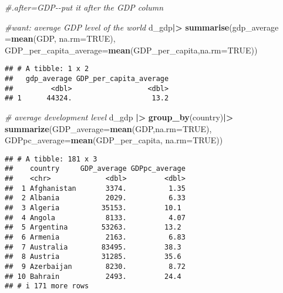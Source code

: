 \documentclass[
]{article}
\newenvironment{Shaded}{\begin{snugshade}}{\end{snugshade}}
\newcommand{\AttributeTok}[1]{\textcolor[rgb]{0.13,0.29,0.53}{#1}}
\newcommand{\CommentTok}[1]{\textcolor[rgb]{0.56,0.35,0.01}{\textit{#1}}}
\newcommand{\ConstantTok}[1]{\textcolor[rgb]{0.56,0.35,0.01}{#1}}
\newcommand{\FunctionTok}[1]{\textcolor[rgb]{0.13,0.29,0.53}{\textbf{#1}}}
\newcommand{\NormalTok}[1]{#1}
\newcommand{\SpecialCharTok}[1]{\textcolor[rgb]{0.81,0.36,0.00}{\textbf{#1}}}
\begin{document}
\begin{Shaded}
\begin{Highlighting}[]
\CommentTok{\#.after=GDP{-}{-}put it after the GDP column}
\end{Highlighting}
\end{Shaded}

\begin{Shaded}
\begin{Highlighting}[]
\CommentTok{\#want: average GDP level of the world}
\NormalTok{d\_gdp}\SpecialCharTok{|\textgreater{}}
  \FunctionTok{summarise}\NormalTok{(}\AttributeTok{gdp\_average =}\FunctionTok{mean}\NormalTok{(GDP, }\AttributeTok{na.rm=}\ConstantTok{TRUE}\NormalTok{),}
            \AttributeTok{GDP\_per\_capita\_average=}\FunctionTok{mean}\NormalTok{(GDP\_per\_capita,}\AttributeTok{na.rm=}\ConstantTok{TRUE}\NormalTok{))}
\end{Highlighting}
\end{Shaded}

\begin{verbatim}
## # A tibble: 1 x 2
##   gdp_average GDP_per_capita_average
##         <dbl>                  <dbl>
## 1      44324.                   13.2
\end{verbatim}

\begin{Shaded}
\begin{Highlighting}[]
\CommentTok{\# average development level}
\NormalTok{d\_gdp }\SpecialCharTok{|\textgreater{}}
  \FunctionTok{group\_by}\NormalTok{(country)}\SpecialCharTok{|\textgreater{}}
  \FunctionTok{summarize}\NormalTok{(}\AttributeTok{GDP\_average=}\FunctionTok{mean}\NormalTok{(GDP,}\AttributeTok{na.rm=}\ConstantTok{TRUE}\NormalTok{),}
            \AttributeTok{GDPpc\_average=}\FunctionTok{mean}\NormalTok{(GDP\_per\_capita, }\AttributeTok{na.rm=}\ConstantTok{TRUE}\NormalTok{))}
\end{Highlighting}
\end{Shaded}

\begin{verbatim}
## # A tibble: 181 x 3
##    country     GDP_average GDPpc_average
##    <chr>             <dbl>         <dbl>
##  1 Afghanistan       3374.          1.35
##  2 Albania           2029.          6.33
##  3 Algeria          35153.         10.1 
##  4 Angola            8133.          4.07
##  5 Argentina        53263.         13.2 
##  6 Armenia           2163.          6.83
##  7 Australia        83495.         38.3 
##  8 Austria          31285.         35.6 
##  9 Azerbaijan        8230.          8.72
## 10 Bahrain           2493.         24.4 
## # i 171 more rows
\end{verbatim}
\end{document}
